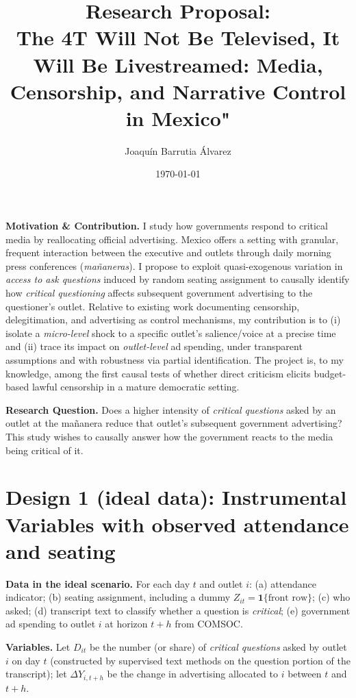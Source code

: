 \documentclass[11pt]{article}
\title{Research Proposal: \\ The 4T Will Not Be Televised, It Will Be Livestreamed: Media, Censorship, and Narrative Control in Mexico"}
\author{Joaqu\'in Barrutia \'Alvarez}
\date{\today}
\begin{document}
\maketitle

\textbf{Motivation \& Contribution.}
I study how governments respond to critical media by reallocating official advertising. Mexico offers a setting with granular, frequent interaction between the executive and outlets through daily morning press conferences (\emph{mañaneras}). I propose to exploit quasi-exogenous variation in \emph{access to ask questions} induced by random seating assignment to causally identify how \emph{critical questioning} affects subsequent government advertising to the questioner's outlet. Relative to existing work documenting censorship, delegitimation, and advertising as control mechanisms, my contribution is to (i) isolate a \emph{micro-level} shock to a specific outlet's salience/voice at a precise time and (ii) trace its impact on \emph{outlet-level} ad spending, under transparent assumptions and with robustness via partial identification. The project is, to my knowledge, among the first causal tests of whether direct criticism elicits budget-based lawful censorship in a mature democratic setting.

\vspace{4pt}
\textbf{Research Question.}
Does a higher intensity of \emph{critical questions} asked by an outlet at the mañanera reduce that outlet's subsequent government advertising?
This study wishes to causally answer how the government reacts to the media being critical of it.


\section*{Design 1 (ideal data): Instrumental Variables with observed attendance and seating}
\textbf{Data in the ideal scenario.} For each day $t$ and outlet $i$: (a) attendance indicator; (b) seating assignment, including a dummy $Z_{it}=\mathbf{1}\{\text{front row}\}$; (c) who asked; (d) transcript text to classify whether a question is \emph{critical}; (e) government ad spending to outlet $i$ at horizon $t \!+\! h$ from COMSOC.

\textbf{Variables.} Let $D_{it}$ be the number (or share) of \emph{critical questions} asked by outlet $i$ on day $t$ (constructed by supervised text methods on the question portion of the transcript); let $\Delta Y_{i,t+h}$ be the change in advertising allocated to $i$ between $t$ and $t{+}h$.
\end{document}

